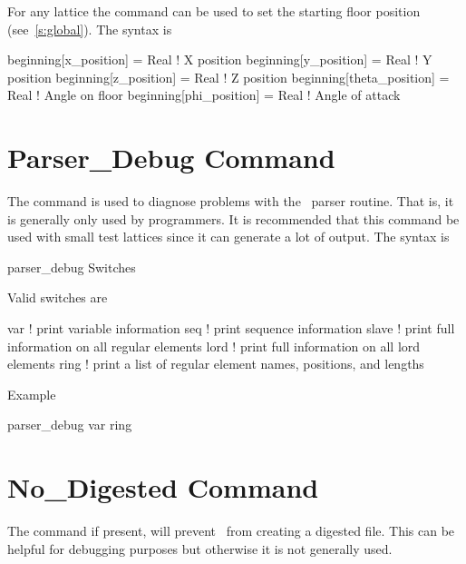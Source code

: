 For any lattice the  command can be used to set the starting floor position 
(see~\ref{s:global}). The syntax is
\begin{example}
  beginning[x_position]     = Real  ! X position
  beginning[y_position]     = Real  ! Y position
  beginning[z_position]     = Real  ! Z position
  beginning[theta_position] = Real  ! Angle on floor
  beginning[phi_position]   = Real  ! Angle of attack
\end{example}

\section{Parser\_Debug Command}

The  command is used to diagnose problems with the \bmad\ parser 
routine. That is, it is generally only used by programmers. 
It is recommended that this
command be used with small test lattices since it can generate a lot of output.
The syntax is
\begin{example}
  parser\_debug Switches
\end{example}
Valid switches are
\begin{example}
  var     ! print variable information
  seq     ! print sequence information
  slave   ! print full information on all regular elements
  lord    ! print full information on all lord elements
  ring    ! print a list of regular element names, positions, and lengths
\end{example}
Example
\begin{example}
  parser\_debug var ring
\end{example}


\section{No\_Digested Command}

The  command if present, will prevent \bmad\ from 
creating a digested file. This can be helpful for debugging purposes but
otherwise it is not generally used.


